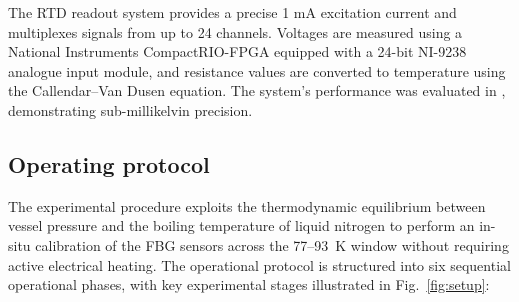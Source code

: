 \documentclass[preprint,11pt]{elsarticle}
\begin{document}
The RTD readout system provides a precise 1 mA excitation current and multiplexes signals from up to 24 channels. Voltages are measured using a National Instruments CompactRIO-FPGA equipped with a 24-bit NI-9238 analogue input module, and resistance values are converted to temperature using the Callendar–Van Dusen equation. The system's performance was evaluated in \cite{RTDs_paper}, demonstrating sub-millikelvin precision.

\subsection{Operating protocol}

The experimental procedure exploits the thermodynamic equilibrium between vessel pressure and the boiling temperature of liquid nitrogen to perform an in-situ calibration of the FBG sensors across the 77--93~K window without requiring active electrical heating. The operational protocol is structured into six sequential operational phases, with key experimental stages illustrated in Fig.~\ref{fig:setup}:
\end{document}

